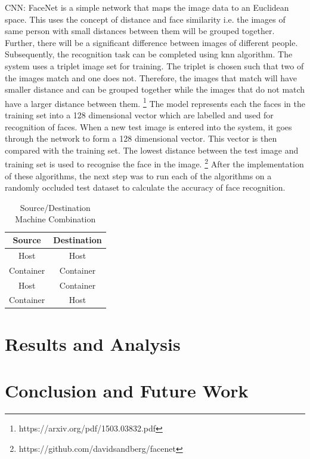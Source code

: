 \documentclass[conference]{IEEEtran}
\begin{document}
CNN: FaceNet is a simple network that maps the image data to an Euclidean space. This uses the concept of distance and face similarity i.e. the images of same person with small distances between them will be grouped together. Further, there will be a significant difference between images of different people. Subsequently, the recognition task can be completed using knn algorithm. The system uses a triplet image set for training. The triplet is chosen such that two of the images match and one does not. Therefore, the images that match will have smaller distance and can be grouped together while the images that do not match have a larger distance between them. \footnote{https://arxiv.org/pdf/1503.03832.pdf} The model represents each the faces in the training set into a 128 dimensional vector which are labelled and used for recognition of faces. When a new test image is entered into the system, it goes through the network to form a 128 dimensional vector. This vector is then compared with the training set. The lowest distance between the test image and training set is used to recognise the face in the image. \footnote{https://github.com/davidsandberg/facenet}
After the implementation of these algorithms, the next step was to run each of the algorithms on a randomly occluded test dataset to calculate the accuracy of face recognition. 

\begin{table}[htbp]
\caption{Source/Destination Machine Combination}
\begin{center}
\begin{tabular}{|c|c|}
\hline
\textbf{Source}&\textbf{Destination} \\
\cline{1-2} 
\hline
Host & Host  \\
\hline
Container & Container  \\
\hline
Host & Container \\
\hline
Container & Host \\
\hline
\end{tabular}
\label{table 1}
\end{center}
\end{table}

\section{Results and Analysis}
\label{sec: 4. Results and Analysis}

\section{Conclusion and Future Work}
\label{sec: 5.Conclusion and Future Work}
\end{document}
